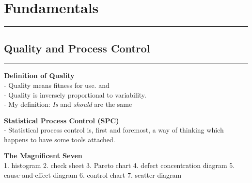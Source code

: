 \section{Fundamentals}
\noindent\rule[\linienAbstand]{\linewidth}{\linienDickeDick}

\subsection{Quality and Process Control}
\noindent\rule[\linienAbstand]{\linewidth}{\linienDicke}
\textbf{Definition of Quality}\\
- Quality means fitness for use. and\\
- Quality is inversely proportional to variability.\\
- My definition: \emph{Is} and \emph{should} are the same


\textbf{Statistical Process Control (SPC)}\\
- Statistical process control is, first and foremost, a way of thinking which happens to have some tools attached.

\textbf{The Magnificent Seven}\\
1. histogram
2. check sheet
3. Pareto chart
4. defect concentration diagram
5. cause-and-effect diagram
6. control chart
7. scatter diagram
